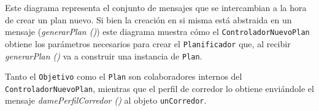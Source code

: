 Este diagrama representa el conjunto de mensajes que se intercambian a la hora de crear un plan nuevo. Si bien la creación en si misma está abstraida en un mensaje (\emph{generarPlan ()}) este diagrama muestra cómo el \texttt{ControladorNuevoPlan} obtiene los parámetros necesarios para crear el \texttt{Planificador} que, al recibir \emph{generarPlan ()} va a construir una instancia de \texttt{Plan}. 

Tanto el \texttt{Objetivo} como el \texttt{Plan} son colaboradores internos del \texttt{ControladorNuevoPlan}, mientras que el perfil de corredor lo obtiene enviándole el mensaje \emph{damePerfilCorredor ()} al objeto \texttt{unCorredor}.